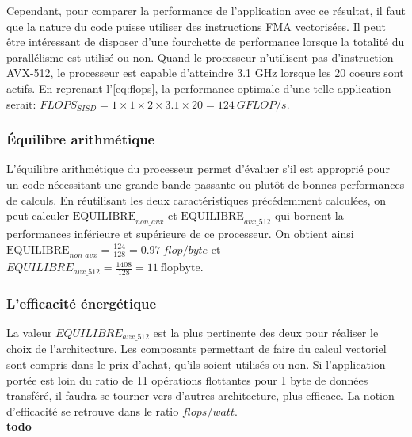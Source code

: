 Cependant, pour comparer la performance de l'application avec ce résultat, il faut que la nature du code puisse utiliser des instructions FMA vectorisées. Il peut être intéressant de disposer d'une fourchette de performance lorsque la totalité du parallélisme est utilisé ou non. Quand le processeur n'utilisent pas d'instruction AVX-512, le processeur est capable d'atteindre 3.1 GHz lorsque les 20 coeurs sont actifs. En reprenant l'\autoref{eq:flops}, la performance optimale d'une telle application serait: $FLOPS_{SISD} = 1 \times 1 \times 2 \times 3.1 \times 20 = 124 \ GFLOP/s$.

\subsubsection{Équilibre arithmétique}
L'équilibre arithmétique du processeur permet d'évaluer s'il est approprié pour un code nécessitant une grande bande passante ou plutôt de bonnes performances de calculs. En réutilisant les deux caractéristiques précédemment calculées, on peut calculer $\text{EQUILIBRE}_{non\_avx}$ et $\text{EQUILIBRE}_{avx\_512}$ qui bornent la performances inférieure et supérieure de ce processeur. On obtient ainsi $\text{EQUILIBRE}_{non\_avx} = \frac{124}{128} = 0.97\ flop/byte$ et $EQUILIBRE_{avx\_512} = \frac{1408}{128} = 11\ \text{flopbyte}$. 
 

\subsubsection{L'efficacité énergétique}

La valeur  $EQUILIBRE_{avx\_512}$ est la plus pertinente des deux pour réaliser le choix de l'architecture. Les composants permettant de faire du calcul vectoriel sont compris dans le prix d'achat, qu'ils soient utilisés ou non. Si l'application portée est loin du ratio de 11 opérations flottantes pour 1 byte de données transféré, il faudra se tourner vers d'autres architecture, plus efficace. La notion d'efficacité se retrouve dans le ratio $flops/watt$.
\\
\textbf{todo}






















